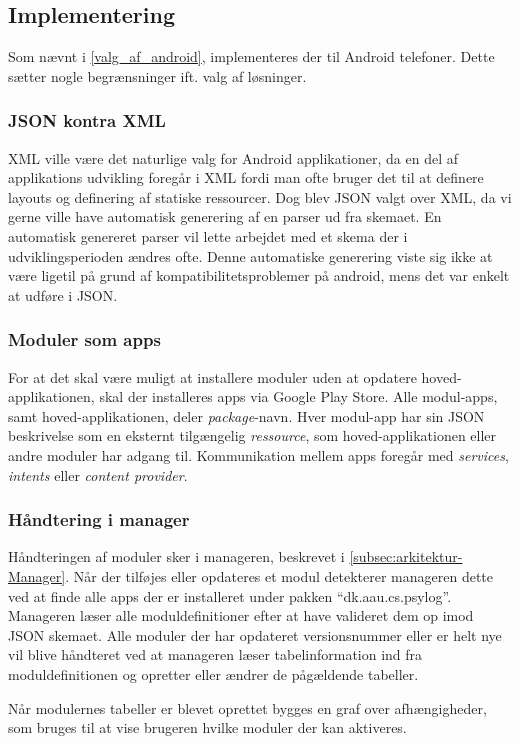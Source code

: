 \subsection{Implementering}
Som nævnt i \cref{valg_af_android}, implementeres der til Android telefoner.
Dette sætter nogle begrænsninger ift. valg af løsninger.

\subsubsection{JSON kontra XML}
XML ville være det naturlige valg for Android applikationer, da en del af applikations udvikling foregår i XML fordi man ofte bruger det til at definere layouts og definering af statiske ressourcer. 
Dog blev JSON valgt over XML, da vi gerne ville have automatisk generering af en parser ud fra skemaet.
En automatisk genereret parser vil lette arbejdet med et skema der i udviklingsperioden ændres ofte.
Denne automatiske generering viste sig ikke at være ligetil på grund af kompatibilitetsproblemer på android, mens det var enkelt at udføre i JSON.

\subsubsection{Moduler som apps}
For at det skal være muligt at installere moduler uden at opdatere hoved-applikationen, skal der installeres apps via Google Play Store.
Alle modul-apps, samt hoved-applikationen, deler \textit{package}-navn.
Hver modul-app har sin JSON beskrivelse som en eksternt tilgængelig \textit{ressource}, som hoved-applikationen eller andre moduler har adgang til.
Kommunikation mellem apps foregår med \textit{services}, \textit{intents} eller \textit{content provider}.

\subsubsection{Håndtering i manager}
Håndteringen af moduler sker i manageren, beskrevet i \cref{subsec:arkitektur-Manager}.
Når der tilføjes eller opdateres et modul detekterer manageren dette ved at finde alle apps der er installeret under pakken ``dk.aau.cs.psylog''.
Manageren læser alle moduldefinitioner efter at have valideret dem op imod JSON skemaet.
Alle moduler der har opdateret versionsnummer eller er helt nye vil blive håndteret ved at manageren læser tabelinformation ind fra moduldefinitionen og opretter eller ændrer de pågældende tabeller.

Når modulernes tabeller er blevet oprettet bygges en graf over afhængigheder, som bruges til at vise brugeren hvilke moduler der kan aktiveres.
